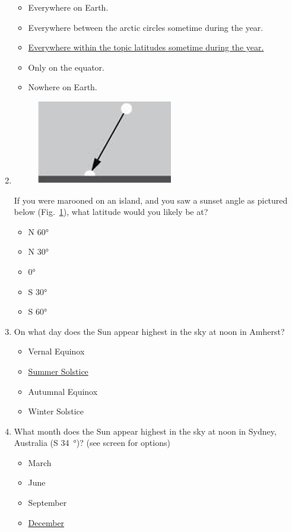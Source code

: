 \documentclass[12pt]{article}
\begin{document}
\begin{enumerate}
\begin{itemize}
    \item Everywhere on Earth.
    \item Everywhere between the arctic circles sometime during the year. 
    \item \underline{Everywhere within the topic latitudes sometime during the year.}
    \item Only on the equator.
    \item Nowhere on Earth.
\end{itemize}
\item
\begin{figure}[htbp]
    \centering
    \includegraphics{lab2_q4.png}
    \caption{}
    \label{fig:l5q4}
\end{figure}
If you were marooned on an island, and you saw a sunset angle as pictured below (Fig.~\ref{fig:l5q4}), what latitude would you likely be at?
\begin{itemize}
    \item N 60°
    \item N 30°
    \item 0°
    \item S 30°
    \item S 60°
\end{itemize}
\item
On what day does the Sun appear highest in the sky at noon in Amherst?
\begin{itemize}
    \item Vernal Equinox
    \item \underline{Summer Solstice}
    \item Autumnal Equinox
    \item Winter Solstice
\end{itemize}
\item
What month does the Sun appear highest in the sky at noon in Sydney, Australia (S \SI{34}{\degree})? (see screen for options)
\begin{itemize}
    \item March
    \item June
    \item September
    \item \underline{December} 
\end{itemize}
\end{enumerate}
\end{document}
